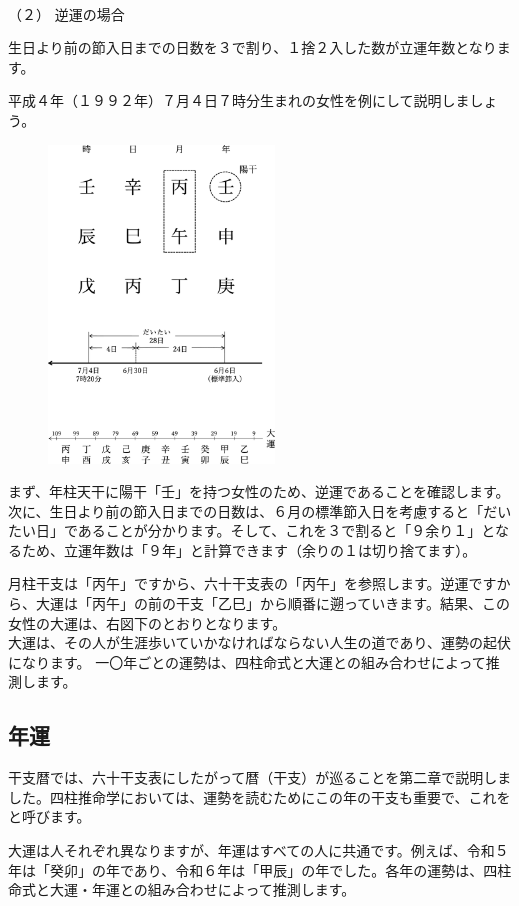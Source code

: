 \documentclass[a5paper,11pt,dvipdfmx]{tarticle}
\begin{document}
\noindent
\\（２） 逆運の場合

生日より前の節入日までの日数を３で割り、１捨２入した数が立運年数となります。

平成４年（１９９２年）７月４日７時分生まれの女性を例にして説明しましょう。

\begin{figure}[h]
  \includegraphics[width=60mm,angle=90]{figs/figure4-6.eps}
\end{figure}

まず、年柱天干に陽干「壬」を持つ女性のため、逆運であることを確認します。次に、生日より前の節入日までの日数は、６月の標準節入日を考慮すると「だいたい日」であることが分かります。そして、これを３で割ると「９余り１」となるため、立運年数は「９年」と計算できます（余りの１は切り捨てます）。

月柱干支は「丙午」ですから、六十干支表の「丙午」を参照します。逆運ですから、大運は「丙午」の前の干支「乙巳」から順番に遡っていきます。結果、この女性の大運は、右図下のとおりとなります。\\

大運は、その人が生涯歩いていかなければならない人生の道であり、運勢の起伏になります。
一〇年ごとの運勢は、四柱命式と大運との組み合わせによって推測します。

\subsection{年運}
干支暦では、六十干支表にしたがって暦（干支）が巡ることを第二章で説明しました。四柱推命学においては、運勢を読むためにこの年の干支も重要で、これをと呼びます。

大運は人それぞれ異なりますが、年運はすべての人に共通です。例えば、令和５年は「癸卯」の年であり、令和６年は「甲辰」の年でした。各年の運勢は、四柱命式と大運・年運との組み合わせによって推測します。
\end{document}
